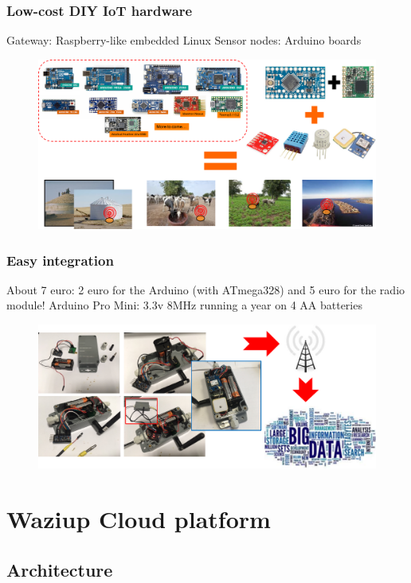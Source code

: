 \documentclass{beamer}
\begin{document}
\begin{frame}
\frametitle{Low-cost DIY IoT hardware}

Gateway: Raspberry-like embedded Linux
Sensor nodes: Arduino boards




  \begin{figure}[H]  
  \centering  
  \includegraphics[width=.7\linewidth]{figures/generic-iot}   
  \label{figure-generic-iot}  
  \end{figure} 

\end{frame}

\begin{frame}
\frametitle{Easy integration}

About 7 euro: 2 euro for the Arduino (with ATmega328) and 5 euro for the radio module!
Arduino Pro Mini: 3.3v 8MHz running a year on 4 AA batteries
  \begin{figure}[H] 
  \centering  
  \includegraphics[width=.8\linewidth]{figures/easy-integration}   
  \label{figure-easy-integration}  
  \end{figure} 

\end{frame}

\section{Waziup Cloud platform}

\subsection{Architecture}
\end{document}
